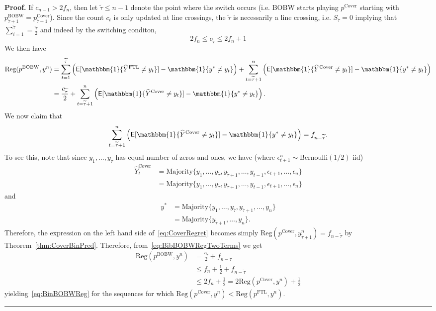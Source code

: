 \documentclass[11pt,letter]{article}
\newenvironment{proof}[1][Proof]{\noindent\textbf{#1.} }{\ \rule{0.5em}{0.5em}}
\newcommand{\Ber}{\mathrm{Bernoulli}}
\newcommand{\indi}{\mathbbm{1}}
\newcommand{\e}{\epsilon}
\newcommand{\Reg}{\mathrm{Reg}}
\newcommand{\pcov}{p^{\mathrm{Cover}}}
\newcommand{\pftl}{p^{\mathrm{FTL}}}
\newcommand{\yftl}{\widehat{Y}^{\mathrm{FTL}}}
\newcommand{\ycov}{\widehat{Y}^{\mathrm{Cover}}}
\newcommand{\maj}{\mathrm{Majority}}
\newcommand{\pbobw}{p^{\mathrm{BOBW}}}
\newcommand{\ttil}{\widetilde{\tau}}
\DeclareMathOperator\E{\textsf{E}}
\begin{document}
\begin{proof}
    If $c_{n-1} > 2f_n$, then let $\ttil \le n-1$ denote the point where the switch occurs (i.e. BOBW starts playing $\pcov$ starting with $\pbobw_{\ttil+1} = \pcov_{\ttil+1}$). Since the count $c_t$ is only updated at line crossings, the $\ttil$ is necessarily a line crossing, i.e. $S_{\ttil} = 0$ implying that $\sum_{i=1}^{\ttil} = \frac{\ttil}{2}$ and indeed by the switching conditon,
    \[
    2f_n \le c_{\ttil} \le 2f_n + 1
    \]
    We then have
    \begin{align}
        \Reg(\pbobw, y^n) &= \sum_{t=1}^{\ttil} \left(\E[\indi\{\yftl \neq y_t\}] - \indi\{y^* \neq y_t\}\right) + \sum_{t = \ttil+1}^n \left(\E[\indi\{\ycov \neq y_t\}] - \indi\{y^* \neq y_t\}\right) \nonumber \\
        &= \frac{c_{\ttil}}{2} + \sum_{t = \ttil+1}^n \left(\E[\indi\{\ycov \neq y_t\}] - \indi\{y^* \neq y_t\}\right) \label{eq:BibBOBWRegTwoTerms}. 
    \end{align}
    We now claim that 
    \begin{align}\label{eq:CovSwitchReg}
    \sum_{t = \ttil+1}^n \left(\E[\indi\{\ycov \neq y_t\}] - \indi\{y^* \neq y_t\}\right) = f_{n - \ttil}.
    \end{align}
    To see this, note that since $y_1,\dotsc,y_{\ttil}$ has equal number of zeros and ones, we have (where $\e_{t+1}^n \sim \Ber(1/2)$ iid)
    \begin{align*}
        \ycov_t &= \maj\{y_1,\dotsc,y_{\ttil},y_{\ttil+1},\dotsc,y_{t-1},\e_{t+1},\dotsc,\e_n\} \\
        &= \maj\{y_1,\dotsc,y_{\ttil},y_{\ttil+1},\dotsc,y_{t-1},\e_{t+1},\dotsc,\e_n\}
    \end{align*}
    and 
    \begin{align*}
        y^* &= \maj\{y_1,\dotsc,y_{\ttil},y_{\ttil+1},\dotsc,y_{n}\}\\
        &= \maj\{y_{\ttil+1},\dotsc,y_n\}.
    \end{align*}
    Therefore, the expression on the left hand side of~\eqref{eq:CoverRegret} becomes simply $\Reg(\pcov,y_{\ttil+1}^n) = f_{n-\ttil}$ by Theorem~\ref{thm:CoverBinPred}. Therefore, from~\eqref{eq:BibBOBWRegTwoTerms} we get 
    \begin{align*}
        \Reg(\pbobw, y^n) &= \frac{c_{\ttil}}{2} + f_{n-\ttil} \\
        &\le f_n + \frac{1}{2} + f_{n-\ttil} \\
        &\le 2f_n + \frac{1}{2} = 2\Reg(\pcov,y^n) + \frac{1}{2}
    \end{align*}
    yielding~\eqref{eq:BinBOBWReg} for the sequences for which $\Reg(\pcov,y^n) < \Reg(\pftl,y^n)$. 
\end{proof}
\end{document}
